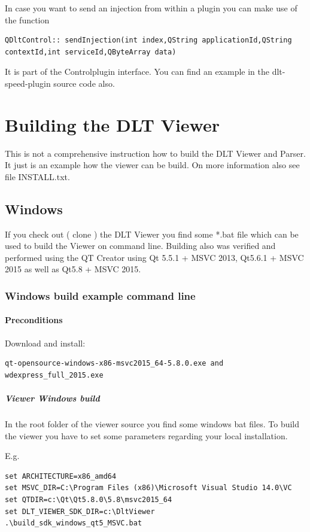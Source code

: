 \documentclass[a4paper,11pt]{article}
\begin{document}
In case you want to send an injection from within a plugin you can make use of the function 
\begin{verbatim}
QDltControl:: sendInjection(int index,QString applicationId,QString contextId,int serviceId,QByteArray data)
\end{verbatim}
It is part of the Controlplugin interface. You can find an example in the dlt-speed-plugin source code also.


\pagebreak


\section{Building the DLT Viewer}
This is not a comprehensive instruction how to build the DLT Viewer and Parser.
It just is an example how the viewer can be build. On more information also see file INSTALL.txt.

\subsection{Windows}
If you check out ( clone ) the DLT Viewer you find some *.bat file which can be used to build the Viewer on command line.
Building also was verified and performed using the QT Creator using Qt 5.5.1 + MSVC 2013, Qt5.6.1 + MSVC 2015 as well as Qt5.8 + MSVC 2015.


\subsubsection{Windows build example command line}
\paragraph{Preconditions}
Download and install:
\begin{verbatim}
qt-opensource-windows-x86-msvc2015_64-5.8.0.exe and
wdexpress_full_2015.exe
\end{verbatim}

\subparagraph{Viewer Windows build}
In the root folder of the viewer source you find some windows bat files.
To build the viewer you have to set some parameters regarding your local installation.

E.g.

\begin{verbatim}
set ARCHITECTURE=x86_amd64
set MSVC_DIR=C:\Program Files (x86)\Microsoft Visual Studio 14.0\VC
set QTDIR=c:\Qt\Qt5.8.0\5.8\msvc2015_64
set DLT_VIEWER_SDK_DIR=c:\DltViewer
.\build_sdk_windows_qt5_MSVC.bat
\end{verbatim}
\end{document}
